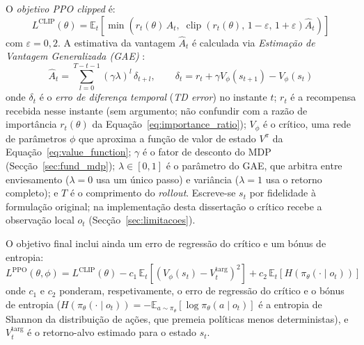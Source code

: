 \documentclass[12pt,reqno, twoside]{amsbook}
\theoremstyle{plain}
\numberwithin{equation}{chapter}
\numberwithin{section}{chapter}
\numberwithin{table}{chapter}
\numberwithin{figure}{chapter}
\begin{document}
O \emph{objetivo PPO \emph{clipped}} é:
\begin{equation}
    L^{\text{CLIP}}(\theta) = \mathbb{E}_t\!\left[\min\!\left(r_t(\theta)\,\hat{A}_t,\;\operatorname{clip}\!\left(r_t(\theta),\, 1{-}\varepsilon,\, 1{+}\varepsilon\right)\hat{A}_t\right)\right]
    \label{eq:ppo_clip}
\end{equation}
com $\varepsilon = 0{,}2$. A estimativa da vantagem $\hat{A}_t$ é calculada via \emph{Estimação de Vantagem Generalizada (GAE)} \cite{schulman2016gae}:
\begin{equation}
    \hat{A}_t = \sum_{l=0}^{T-t-1} (\gamma\lambda)^l \,\delta_{t+l}, \qquad \delta_t = r_t + \gamma V_\phi(s_{t+1}) - V_\phi(s_t)
    \label{eq:gae}
\end{equation}
onde $\delta_t$ é o \emph{erro de diferença temporal} (\textit{TD error}) no instante $t$; $r_t$ é a recompensa recebida nesse instante (sem argumento; não confundir com a razão de importância $r_t(\theta)$ da Equação~\ref{eq:importance_ratio}); $V_\phi$ é o crítico, uma rede de parâmetros $\phi$ que aproxima a função de valor de estado $V^\pi$ da Equação~\ref{eq:value_function}; $\gamma$ é o fator de desconto do MDP (Secção~\ref{sec:fund_mdp}); $\lambda \in [0,1]$ é o parâmetro do GAE, que arbitra entre enviesamento ($\lambda = 0$ usa um único passo) e variância ($\lambda = 1$ usa o retorno completo); e $T$ é o comprimento do \textit{rollout}. Escreve-se $s_t$ por fidelidade à formulação original; na implementação desta dissertação o crítico recebe a observação local $o_t$ (Secção~\ref{sec:limitacoes}).

O objetivo final inclui ainda um erro de regressão do crítico e um bónus de entropia:
\begin{equation}
    L^{\text{PPO}}(\theta,\phi) = L^{\text{CLIP}}(\theta) - c_1\,\mathbb{E}_t\!\left[(V_\phi(s_t) - V_t^{\text{targ}})^2\right] + c_2\,\mathbb{E}_t\!\left[H(\pi_\theta(\cdot\mid o_t))\right]
    \label{eq:ppo_full}
\end{equation}
onde $c_1$ e $c_2$ ponderam, respetivamente, o erro de regressão do crítico e o bónus de entropia ($H(\pi_\theta(\cdot\mid o_t)) = -\mathbb{E}_{a\sim\pi_\theta}[\log \pi_\theta(a\mid o_t)]$ é a entropia de Shannon da distribuição de ações, que premeia políticas menos deterministas), e $V_t^{\text{targ}}$ é o retorno-alvo estimado para o estado $s_t$.
\end{document}
